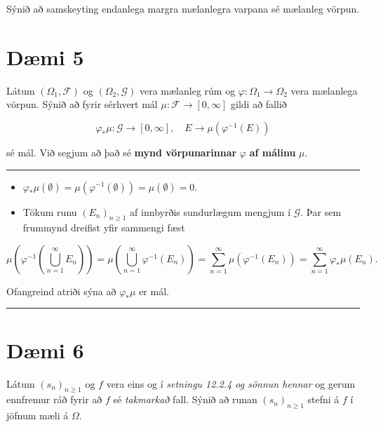 \documentclass[]{book}
\begin{document}
Sýnið að samskeyting endanlega margra mælanlegra varpana sé mælanleg vörpun.

\hypertarget{dmi-5-4}{%
\section*{Dæmi 5}\label{dmi-5-4}}

Látum \((\Omega_1, \mathcal F)\) og \((\Omega_2, \mathcal G)\) vera mælanleg rúm og \(\varphi: \Omega_1 \rightarrow \Omega_2\) vera mælanlega vörpun. Sýnið að fyrir sérhvert mál \(\mu: \mathcal F \rightarrow [0, \infty]\) gildi að fallið

\[
\varphi_* \mu: \mathcal G \rightarrow [0, \infty], \quad E \rightarrow \mu(\varphi^{-1}(E))
\]

sé mál. Við segjum að það sé \textbf{mynd vörpunarinnar} \(\varphi\) \textbf{af málinu} \(\mu\).

\begin{center}\rule{0.5\linewidth}{\linethickness}\end{center}

\begin{itemize}
\item
  \(\varphi_*\mu(\emptyset) = \mu(\varphi^{-1}(\emptyset)) = \mu(\emptyset) = 0\).
\item
  Tökum runu \((E_n)_{n\geq1}\) af innbyrðis sundurlægum mengjum í \(\mathcal G\). Þar sem frummynd dreifist yfir sammengi fæst
\end{itemize}

\[
\mu\left(\varphi^{-1}\left(\bigcup_{n=1}^\infty E_n\right)\right) =
\mu\left(\bigcup_{n=1}^\infty\varphi^{-1}\left( E_n\right)\right) = 
\sum_{n=1}^\infty\mu(\varphi^{-1}(E_n)) = \sum_{n=1}^\infty\varphi_*\mu(E_n).
\]

Ofangreind atriði sýna að \(\varphi_*\mu\) er mál.

\begin{center}\rule{0.5\linewidth}{\linethickness}\end{center}

\hypertarget{dmi-6-4}{%
\section*{Dæmi 6}\label{dmi-6-4}}

Látum \((s_n)_{n\geq1}\) og \(f\) vera eins og í \emph{setningu 12.2.4 og sönnun hennar} og gerum ennfremur ráð fyrir að \(f\) sé \emph{takmarkað} fall. Sýnið að runan \((s_n)_{n\geq1}\) stefni á \(f\) í jöfnum mæli á \(\Omega\).
\end{document}
